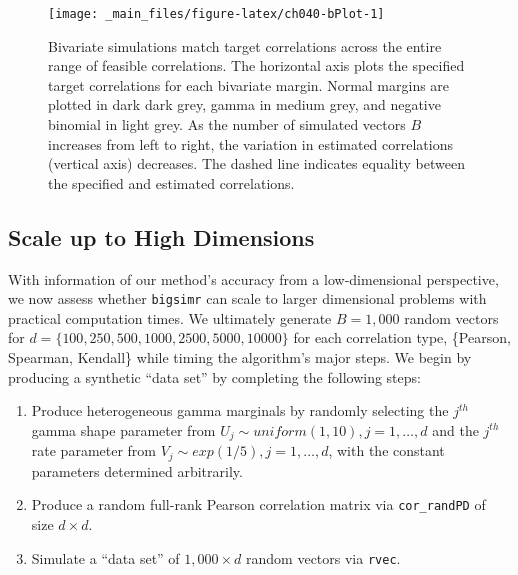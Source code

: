 \documentclass[
]{jss}
\providecommand{\tightlist}{%
  \setlength{\itemsep}{0pt}\setlength{\parskip}{0pt}}
\begin{document}
\begin{CodeChunk}
\begin{figure}

{\centering \texttt{[image: \_main\_files/figure-latex/ch040-bPlot-1]} 

}

\caption[Bivariate simulations match target correlations across the entire range of feasible correlations]{Bivariate simulations match target correlations across the entire range of feasible correlations. The horizontal axis plots the specified target correlations for each bivariate margin. Normal margins are plotted in dark dark grey, gamma in medium grey, and negative binomial in light grey. As the number of simulated vectors $B$ increases from left to right, the variation in estimated correlations (vertical axis) decreases. The dashed line indicates equality between the specified and estimated correlations.}\label{fig:ch040-bPlot}
\end{figure}
\end{CodeChunk}

\hypertarget{scale-up-to-high-dimensions}{%
\subsection{Scale up to High Dimensions}\label{scale-up-to-high-dimensions}}

With information of our method's accuracy from a low-dimensional perspective, we now assess whether \texttt{bigsimr} can scale to larger dimensional problems with practical computation times. We ultimately generate \(B=1,000\) random vectors for \(d=\{100, 250, 500, 1000, 2500, 5000, 10000\}\) for each correlation type, \{Pearson, Spearman, Kendall\} while timing the algorithm's major steps. We begin by producing a synthetic ``data set'' by completing the following steps:


\begin{enumerate}
\def\labelenumi{\arabic{enumi}.}
\tightlist
\item
  Produce heterogeneous gamma marginals by randomly selecting the \(j^{th}\) gamma shape parameter from \(U_j \sim uniform(1,10), j=1,\ldots,d\) and the \(j^{th}\) rate parameter from \(V_j \sim exp(1/5), j=1,\ldots,d\), with the constant parameters determined arbitrarily.
\item
  Produce a random full-rank Pearson correlation matrix via \texttt{cor\_randPD} of size \(d \times d\).
\item
  Simulate a ``data set'' of \(1,000 \times d\) random vectors via \texttt{rvec}.
\end{enumerate}
\end{document}
